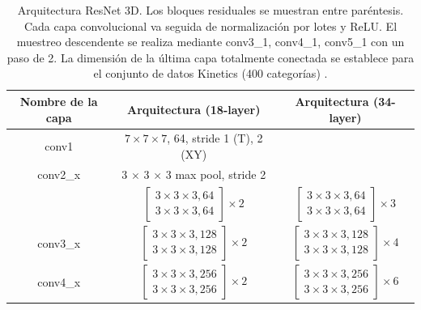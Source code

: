\begin{table}[!htbp]
\centering
\caption{Arquitectura ResNet 3D. Los bloques residuales se muestran entre paréntesis. Cada capa convolucional va seguida de normalización por lotes y ReLU. El muestreo descendente se realiza mediante conv3\_1, conv4\_1, conv5\_1 con un paso de 2. La dimensión de la última capa totalmente conectada se establece para el conjunto de datos Kinetics (400 categorías) \parencite{hara2017learning}.}
\label{tab:resnet_arch}
\begin{tabular}{ccc}
\hline
Nombre de la capa & Arquitectura (18-layer) & Arquitectura (34-layer) \\
\hline
conv1 & $7 \times 7 \times 7$, 64, stride 1 (T), 2 (XY) & \\
\hline
conv2\_x & 3 $\times$ 3 $\times$ 3 max pool, stride 2 &  \\
         & $\left[\begin{array}{c}
         3 \times 3 \times 3, 64 \\
         3 \times 3 \times 3, 64
         \end{array}\right] \times 2$ &
         $\left[\begin{array}{c}
         3 \times 3 \times 3, 64 \\
         3 \times 3 \times 3, 64
         \end{array}\right] \times 3$ \\
\hline
conv3\_x & $\left[\begin{array}{c}
         3 \times 3 \times 3, 128 \\
         3 \times 3 \times 3, 128
         \end{array}\right] \times 2$ &
         $\left[\begin{array}{c}
         3 \times 3 \times 3, 128 \\
         3 \times 3 \times 3, 128
         \end{array}\right] \times 4$ \\
\hline
conv4\_x & $\left[\begin{array}{c}
         3 \times 3 \times 3, 256 \\
         3 \times 3 \times 3, 256
         \end{array}\right] \times 2$ &
         $\left[\begin{array}{c}
         3 \times 3 \times 3, 256 \\
         3 \times 3 \times 3, 256
         \end{array}\right] \times 6$ \\

\end{tabular}
\end{table}
